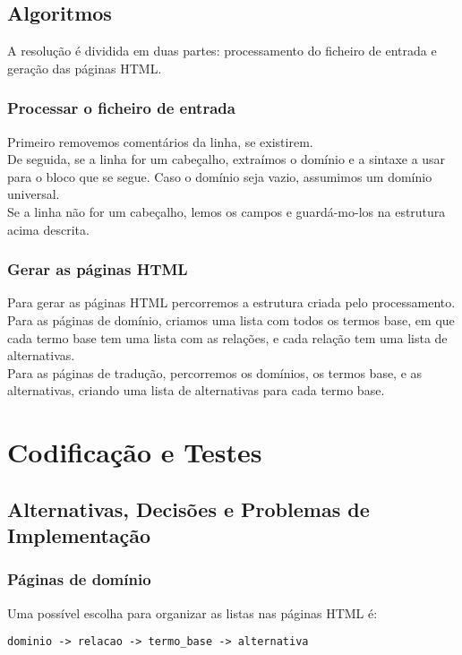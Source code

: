 \documentclass{report}
\begin{document}
\section{Algoritmos}
A resolução é dividida em duas partes: processamento do ficheiro de entrada e geração das páginas HTML.

\subsection{Processar o ficheiro de entrada}
Primeiro removemos comentários da linha, se existirem.\\
De seguida, se a linha for um cabeçalho, extraímos o domínio e a sintaxe a usar para o bloco que se segue.
Caso o domínio seja vazio, assumimos um domínio universal.\\
Se a linha não for um cabeçalho, lemos os campos e guardá-mo-los na estrutura acima descrita.

\subsection{Gerar as páginas HTML}
Para gerar as páginas HTML percorremos a estrutura criada pelo processamento.\\
Para as páginas de domínio, criamos uma lista com todos os termos base, em que cada termo base tem uma lista com as relações, e cada relação tem uma lista de alternativas.\\
Para as páginas de tradução, percorremos os domínios, os termos base, e as alternativas, criando uma lista de alternativas para cada termo base.\\

\chapter{Codificação e Testes}

\section{Alternativas, Decisões e Problemas de Implementação}

\subsection{Páginas de domínio}

Uma possível escolha para organizar as listas nas páginas HTML é:

\begin{verbatim}
dominio -> relacao -> termo_base -> alternativa
\end{verbatim}
\end{document}
